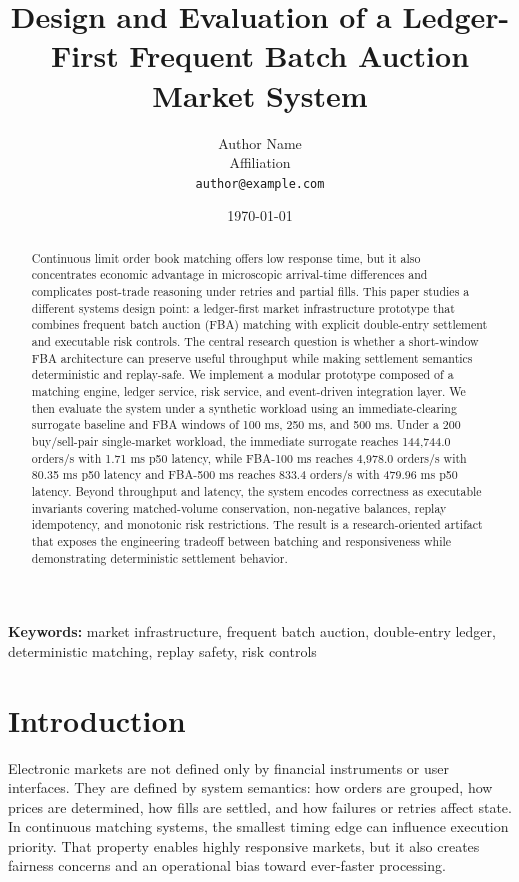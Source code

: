 \documentclass[11pt]{article}
\title{Design and Evaluation of a Ledger-First Frequent Batch Auction Market System}
\author{
  Author Name \\
  Affiliation \\
  \texttt{author@example.com}
}
\date{\today}
\begin{document}
\maketitle

\begin{abstract}
Continuous limit order book matching offers low response time, but it also concentrates economic advantage in microscopic arrival-time differences and complicates post-trade reasoning under retries and partial fills. This paper studies a different systems design point: a ledger-first market infrastructure prototype that combines frequent batch auction (FBA) matching with explicit double-entry settlement and executable risk controls. The central research question is whether a short-window FBA architecture can preserve useful throughput while making settlement semantics deterministic and replay-safe. We implement a modular prototype composed of a matching engine, ledger service, risk service, and event-driven integration layer. We then evaluate the system under a synthetic workload using an immediate-clearing surrogate baseline and FBA windows of 100 ms, 250 ms, and 500 ms. Under a 200 buy/sell-pair single-market workload, the immediate surrogate reaches 144{,}744.0 orders/s with 1.71 ms p50 latency, while FBA-100 ms reaches 4{,}978.0 orders/s with 80.35 ms p50 latency and FBA-500 ms reaches 833.4 orders/s with 479.96 ms p50 latency. Beyond throughput and latency, the system encodes correctness as executable invariants covering matched-volume conservation, non-negative balances, replay idempotency, and monotonic risk restrictions. The result is a research-oriented artifact that exposes the engineering tradeoff between batching and responsiveness while demonstrating deterministic settlement behavior.
\end{abstract}

\noindent\textbf{Keywords:} market infrastructure, frequent batch auction, double-entry ledger, deterministic matching, replay safety, risk controls

\section{Introduction}

Electronic markets are not defined only by financial instruments or user interfaces. They are defined by system semantics: how orders are grouped, how prices are determined, how fills are settled, and how failures or retries affect state. In continuous matching systems, the smallest timing edge can influence execution priority. That property enables highly responsive markets, but it also creates fairness concerns and an operational bias toward ever-faster processing.
\end{document}
